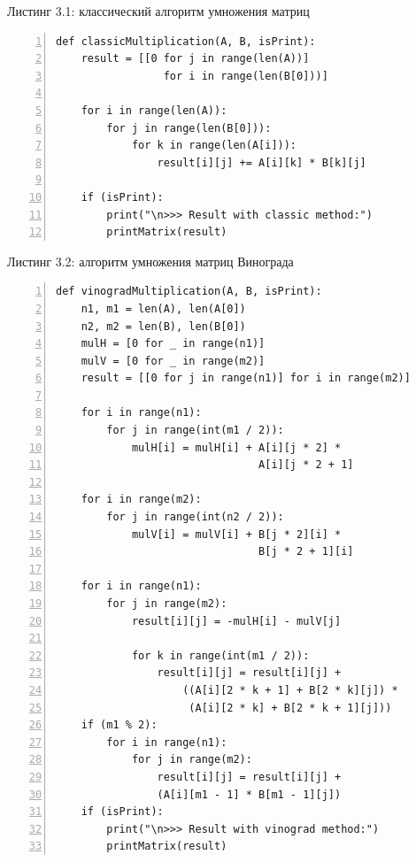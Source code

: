 \documentclass[12pt,a4paper]{report}
\begin{document}
\textrm{Листинг 3.1: классический алгоритм умножения матриц}
\begin{lstlisting}[frame=single, numbers=left]
def classicMultiplication(A, B, isPrint):
    result = [[0 for j in range(len(A))] 
                 for i in range(len(B[0]))]

    for i in range(len(A)):
        for j in range(len(B[0])):
            for k in range(len(A[i])):
                result[i][j] += A[i][k] * B[k][j]
    
    if (isPrint):
        print("\n>>> Result with classic method:")
        printMatrix(result)
\end{lstlisting}
\newpage
\textrm{Листинг 3.2: алгоритм умножения матриц Винограда}
\begin{lstlisting}[frame=single, numbers=left]
def vinogradMultiplication(A, B, isPrint):
    n1, m1 = len(A), len(A[0])
    n2, m2 = len(B), len(B[0])
    mulH = [0 for _ in range(n1)]
    mulV = [0 for _ in range(m2)]
    result = [[0 for j in range(n1)] for i in range(m2)]

    for i in range(n1):
        for j in range(int(m1 / 2)):
            mulH[i] = mulH[i] + A[i][j * 2] * 
                                A[i][j * 2 + 1]
        
    for i in range(m2):
        for j in range(int(n2 / 2)):
            mulV[i] = mulV[i] + B[j * 2][i] * 
                                B[j * 2 + 1][i]

    for i in range(n1):
        for j in range(m2):
            result[i][j] = -mulH[i] - mulV[j]

            for k in range(int(m1 / 2)):
                result[i][j] = result[i][j] + 
                    ((A[i][2 * k + 1] + B[2 * k][j]) * 
                     (A[i][2 * k] + B[2 * k + 1][j]))  
    if (m1 % 2):
        for i in range(n1):
            for j in range(m2):
                result[i][j] = result[i][j] + 
                (A[i][m1 - 1] * B[m1 - 1][j])  
    if (isPrint):
        print("\n>>> Result with vinograd method:")
        printMatrix(result)
\end{lstlisting}
\end{document}
